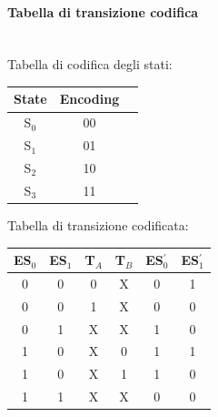\documentclass{report}
\newcommand{\subsubsubsection}[1]{\paragraph{#1}\mbox{}\\}
\begin{document}
            \subsubsubsection{Tabella di transizione codifica}
                Tabella di codifica degli stati:
                \begin{center}
                    \begin{tabular}{|c|c|c|}
                        \hline
                        State & Encoding \\
                        \hline
                        S$_0$ & 00 \\
                        \hline
                        S$_1$ & 01 \\
                        \hline
                        S$_2$ & 10 \\
                        \hline
                        S$_3$ & 11 \\
                        \hline
                    \end{tabular}
                \end{center}
                Tabella di transizione codificata:
                \begin{center}
                    \begin{tabular}{|c|c|c|c|c|c|}
                        \hline
                        ES$_0$ & ES$_1$ & T$_A$ & T$_B$ & ES$^{'}_0$ & ES$^{'}_1$ \\
                        \hline
                        0 & 0 & 0 & X & 0 & 1 \\
                        \hline
                        0 & 0 & 1 & X & 0 & 0 \\
                        \hline
                        0 & 1 & X & X & 1 & 0 \\
                        \hline
                        1 & 0 & X & 0 & 1 & 1 \\
                        \hline
                        1 & 0 & X & 1 & 1 & 0 \\
                        \hline
                        1 & 1 & X & X & 0 & 0 \\
                        \hline
                    \end{tabular}
                \end{center}
\end{document}
